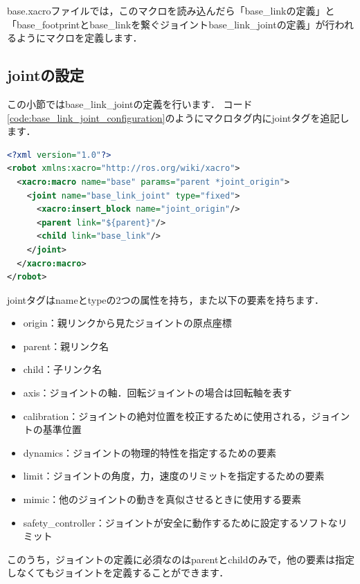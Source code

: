 \documentclass[{../../master}]{subfiles}
\begin{document}
\textsf{base.xacro}ファイルでは，このマクロを読み込んだら「\textsf{base\_link}の定義」と「\textsf{base\_footprint}と\textsf{base\_link}を繋ぐジョイント\textsf{base\_link\_joint}の定義」が行われるようにマクロを定義します．

\subsection{\textsf{joint}の設定}

この小節では\textsf{base\_link\_joint}の定義を行います．
コード\ref{code:base_link_joint_configuration}のようにマクロタグ内に\textsf{joint}タグを追記します．

\begin{lstlisting}[language=XML, caption=Configurate \textsf{base\_link\_joint}, label=code:base_link_joint_configuration]
<?xml version="1.0"?>
<robot xmlns:xacro="http://ros.org/wiki/xacro">
  <xacro:macro name="base" params="parent *joint_origin">
    <joint name="base_link_joint" type="fixed">
      <xacro:insert_block name="joint_origin"/>
      <parent link="${parent}"/>
      <child link="base_link"/>
    </joint>
  </xacro:macro>
</robot>
\end{lstlisting}

\textsf{joint}タグは\textsf{name}と\textsf{type}の2つの属性を持ち，また以下の要素を持ちます．\cite{urdf_xml_joint}

\begin{itemize}
  \item \textsf{origin}：親リンクから見たジョイントの原点座標
  \item \textsf{parent}：親リンク名
  \item \textsf{child}：子リンク名
  \item \textsf{axis}：ジョイントの軸．回転ジョイントの場合は回転軸を表す
  \item \textsf{calibration}：ジョイントの絶対位置を校正するために使用される，ジョイントの基準位置
  \item \textsf{dynamics}：ジョイントの物理的特性を指定するための要素
  \item \textsf{limit}：ジョイントの角度，力，速度のリミットを指定するための要素
  \item \textsf{mimic}：他のジョイントの動きを真似させるときに使用する要素
  \item \textsf{safety\_controller}：ジョイントが安全に動作するために設定するソフトなリミット
\end{itemize}

\noindent
このうち，ジョイントの定義に必須なのは\textsf{parent}と\textsf{child}のみで，他の要素は指定しなくてもジョイントを定義することができます．
\end{document}
